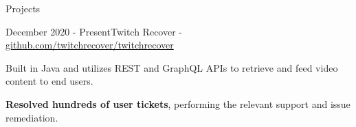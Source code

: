 \documentclass{article}
\newlength{\tabin}
\newlength{\secsep}
\newcommand{\lineunder}{\vspace*{-8pt} \\ \hspace*{-6pt} \hrulefill \\ \vspace*{-15pt}}
\newenvironment{tabbedsection}[1]{
  \begin{list}{}{
      \setlength{\itemsep}{0pt}
      \setlength{\labelsep}{0pt}
      \setlength{\labelwidth}{0pt}
      \setlength{\leftmargin}{0pt}
      \setlength{\rightmargin}{\tabin}
      \setlength{\listparindent}{0pt}
      \setlength{\parsep}{0pt}
      \setlength{\parskip}{0pt}
      \setlength{\partopsep}{0pt}
      \setlength{\topsep}{#1}
    }
  \item[]
}{\end{list}}
\newenvironment{resume_section}[1]{
  \filbreak
  \vspace{2\secsep}
  \textsc{\color{blue}\large#1}
  \lineunder
  \begin{tabbedsection}{\secsep}
}{\end{tabbedsection}}
\newenvironment{resume_subsection}[2]{
  \textbf{\color{BlueViolet}#2} \hfill {\normalsize (#1)} \hspace{-5em}
  \begin{tabbedsection}{0.5\secsep}
  \begin{subitems}
}{\end{subitems}\end{tabbedsection}}
\newenvironment{subitems}{
  \renewcommand{\labelitemi}{-}
  \begin{itemize}
      \setlength{\labelsep}{1em}
}{\end{itemize}}
\begin{document}
\begin{resume_section}{Projects}
\begin{resume_subsection}{December 2020 - Present}{Twitch Recover - \faGithub \hspace{0.01cm} \href{https://github.com/twitchrecover/twitchrecover}{github.com/twitchrecover/twitchrecover}}
        \item Built in Java and utilizes REST and GraphQL APIs to retrieve and feed video content to end users.
        \item \textbf{Resolved hundreds of user tickets}, performing the relevant support and issue remediation.
    \end{resume_subsection}
\end{resume_section}

\vspace{2\secsep}
\end{document}
